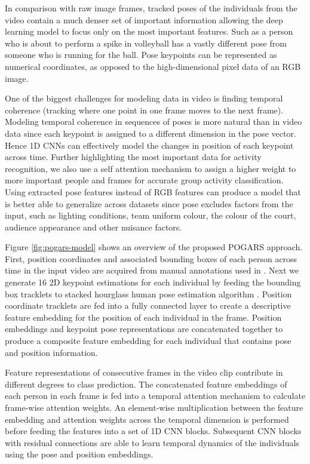 \documentclass[a4paper,fleqn]{cas-dc}
\begin{document}
In comparison with raw image frames, tracked poses of the individuals from the video contain a much denser set of important information allowing the deep learning model to focus only on the most important features. 
Such as a person who is about to perform a spike in volleyball has a vastly different pose from someone who is running for the ball. 
Pose keypoints can be represented as numerical coordinates, as opposed to the high-dimensional pixel data of an RGB image.

One of the biggest challenges for modeling data in video is finding temporal coherence (tracking where one point in one frame moves to the next frame). Modeling temporal coherence in sequences of poses is more natural than in video data since each keypoint is assigned to a different dimension in the pose vector. 
Hence 1D CNNs can effectively model the changes in position of each keypoint across time. 
Further highlighting the most important data for activity recognition, we also use a self attention mechanism to assign a higher weight to more important people and frames for accurate group activity classification. Using extracted pose features instead of RGB features can produce a model that is better able to generalize across datasets since pose excludes factors from the input, such as lighting conditions, team uniform colour, the colour of the court, audience appearance and other nuisance factors.
  
Figure \ref{fig:pogars-model} shows an overview of the proposed POGARS approach. 
First, position coordinates and associated bounding boxes of each person across time in the input video are acquired from manual annotations used in \cite{Sendo2019_HeatmappingOfPeople}.
Next we generate 16 2D keypoint estimations for each individual by feeding the bounding box tracklets to stacked hourglass human pose estimation algorithm \cite{Newell2016_stackedHourGlass}. 
Position coordinate tracklets are fed into a fully connected layer to create a descriptive feature embedding for the position of each individual in the frame. 
Position embeddings and keypoint pose representations are concatenated together to produce a composite feature embedding for each individual that contains pose and position information.

Feature representations of consecutive frames in the video clip contribute in different degrees to class prediction. 
The concatenated feature embeddings of each person in each frame is fed into a temporal attention mechanism to calculate frame-wise attention weights. 
An element-wise multiplication between the feature embedding and attention weights across the temporal dimension is performed before feeding the features into a set of 1D CNN blocks.
Subsequent CNN blocks with residual connections are able to learn temporal dynamics of the individuals using the pose and position embeddings.
\end{document}
